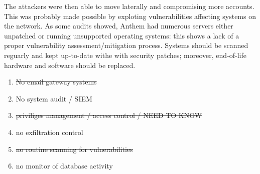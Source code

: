\documentclass[a4paper]{article}
\begin{document}
	The attackers were then able to move laterally and compromising more accounts. This was probably made possible by exploting vulnerabilities affecting systems on the network. As some audits \cite{anthemAuditReport} showed, Anthem had numerous servers either unpatched or running unsupported operating systems: this shows a lack of a proper vulnerability assessment/mitigation process. Systems should be scanned reguarly and kept up-to-date withe with security patches; moreover, end-of-life hardware and software should be replaced.
	
	
	
	
	


	\begin{enumerate}
		\item \st{No email gateway systems}
		\item No system audit / SIEM
		\item \st{priviliges management / access control / NEED TO KNOW}
		\item no exfiltration control
		\item \st{no routine scanning for vulnerabilities}
		\item no monitor of database activity
	\end{enumerate}
	\printbibliography
\end{document}

